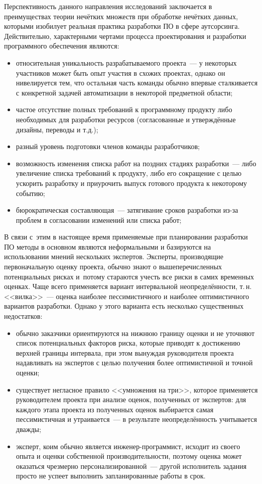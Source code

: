 Перспективность данного направления исследований заключается в преимуществах теории нечётких множеств при обработке нечётких данных, которыми изобилует реальная практика разработки ПО в сфере аутсорсинга. Действительно, характерными чертами процесса проектирования и разработки программного обеспечения являются:
\begin{itemize}
  \item относительная уникальность разрабатываемого проекта~--- у некоторых участников может быть опыт участия в схожих проектах, однако он нивелируется тем, что остальная часть команды обычно впервые сталкивается с конкретной задачей автоматизации в некоторой предметной области;
  \item частое отсутствие полных требований к программному продукту либо необходимых для разработки ресурсов (согласованные и утверждённые дизайны, переводы и т.д.);
  \item разный уровень подготовки членов команды разработчиков;
  \item возможность изменения списка работ на поздних стадиях разработки~--- либо увеличение списка требований к продукту, либо его сокращение с целью ускорить разработку и приурочить выпуск готового продукта к некоторому событию;
  \item бюрократическая составляющая~--- затягивание сроков разработки из-за проблем в согласовании изменений или списка работ;
\end{itemize}

В связи с~этим в настоящее время применяемые при планировании разработки ПО методы в основном являются неформальными и базируются на использовании мнений нескольких экспертов. Эксперты, производящие первоначальную оценку проекта, обычно знают о вышеперечисленных потенциальных рисках и~потому стараются учесть все риски в самих временных оценках. Чаще всего применяется вариант интервальной неопределённости, т.\,н. <<вилка>>~--- оценка наиболее пессимистичного и наиболее оптимистичного вариантов разработки. Однако у этого варианта есть несколько существенных недостатков:
\begin{itemize}
  \item обычно заказчики ориентируются на нижнюю границу оценки и не уточняют список потенциальных факторов риска, которые приводят к достижению верхней границы интервала, при этом вынуждая руководителя проекта надавливать на экспертов с целью получения более оптимистичной и точной оценки;
  \item существует негласное правило <<умножения на три>>, которое применяется руководителем проекта при анализе оценок, полученных от экспертов: для каждого этапа проекта из полученных оценок выбирается самая пессимистичная и утраивается~--- в результате неопределённость учитывается дважды; 
  \item эксперт, коим обычно является инженер-программист, исходит из своего опыта и оценки собственной производительности, поэтому оценка может оказаться чрезмерно персонализированной~--- другой исполнитель задания просто не успеет выполнить запланированные работы в срок.
\end{itemize}

